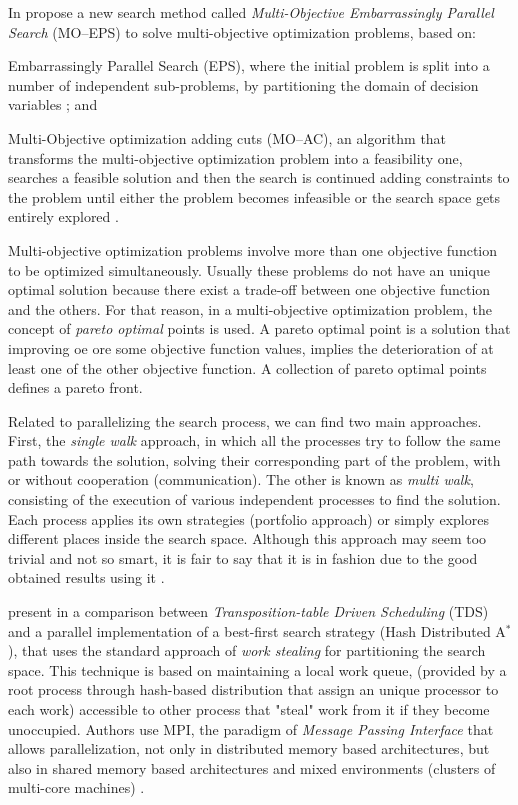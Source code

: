 In \cite{Yasuhara2015}  propose a new search method called \textit{Multi-Objective Embarrassingly Parallel Search} (MO--EPS) to solve multi-objective optimization problems, based on: 
\begin{inparaenum}[i)]
	\item Embarrassingly Parallel Search (EPS), where the initial problem is split into a number of independent sub-problems, by partitioning the domain of decision variables \cite{Rezgui2013, Regin2014}; and
	\item Multi-Objective optimization adding cuts (MO--AC), an algorithm that transforms the multi-objective optimization problem into a feasibility one, searches a feasible solution and then the search is continued adding constraints to the problem until either the problem becomes infeasible or the search space gets entirely explored \cite{Kotecha2010}.
\end{inparaenum}
Multi-objective optimization problems involve more than one objective function to be optimized simultaneously. Usually these problems do not have an unique optimal solution because there exist a trade-off between one objective function and the others. For that reason, in a multi-objective optimization problem, the concept of \textit{pareto optimal} points is used. A pareto optimal point is a solution that improving oe ore some objective function values, implies the deterioration of at least one of the other objective function. A collection of pareto optimal points defines a pareto front.

Related to parallelizing the search process, we can find two main approaches. First, the {\it single walk} approach, in which all the processes try to follow the same path towards the solution, solving their corresponding part of the problem, with or without cooperation (communication). The other is known as {\it multi walk}, consisting of the execution of various independent processes to find the solution. Each process applies its own strategies (portfolio approach) or simply explores different places inside the search space. Although this approach may seem too trivial and not so smart, it is fair to say that it is in fashion due to the good obtained results using it \cite{Diaz}.

 present in \cite{Kishimoto2013} a comparison between \textit{Transposition-table Driven Scheduling} (TDS) and a parallel implementation of a best-first search strategy (Hash Distributed A$^*$), that uses the standard approach of \textit{work stealing} for partitioning the search space. This technique is based on maintaining a local work queue, (provided by a root process through hash-based distribution that assign an unique processor to each work) accessible to other process that "steal" work from it if they become unoccupied. Authors use MPI, the paradigm of \textit{Message Passing Interface} that allows parallelization, not only in distributed memory based architectures, but also in shared memory based architectures and mixed environments (clusters of multi-core machines) \cite{Grama2003a}.


